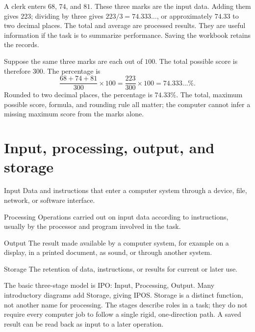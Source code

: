 \begin{example}
A clerk enters $68$, $74$, and $81$. These three marks are the input data.
Adding them gives $223$; dividing by three gives
$223/3=74.333\ldots$, or approximately $74.33$ to two decimal places. The
total and average are processed results. They are useful information if the
task is to summarize performance. Saving the workbook retains the records.
\end{example}

\begin{example}
Suppose the same three marks are each out of $100$. The total possible score
is therefore $300$. The percentage is
\[
  \frac{68+74+81}{300}\times 100
  =\frac{223}{300}\times 100
  =74.333\ldots\%.
\]
Rounded to two decimal places, the percentage is $74.33\%$. The total,
maximum possible score, formula, and rounding rule all matter; the computer
cannot infer a missing maximum score from the marks alone.
\end{example}

\section{Input, processing, output, and storage}
\begin{definitionbox}{Input}
Data and instructions that enter a computer system through a device, file,
network, or software interface.
\end{definitionbox}

\begin{definitionbox}{Processing}
Operations carried out on input data according to instructions, usually by
the processor and program involved in the task.
\end{definitionbox}

\begin{definitionbox}{Output}
The result made available by a computer system, for example on a display, in
a printed document, as sound, or through another system.
\end{definitionbox}

\begin{definitionbox}{Storage}
The retention of data, instructions, or results for current or later use.
\end{definitionbox}

The basic three-stage model is IPO: Input, Processing, Output. Many
introductory diagrams add Storage, giving IPOS. Storage is a distinct
function, not another name for processing. The stages describe roles in a
task; they do not require every computer job to follow a single rigid,
one-direction path. A saved result can be read back as input to a later
operation.

